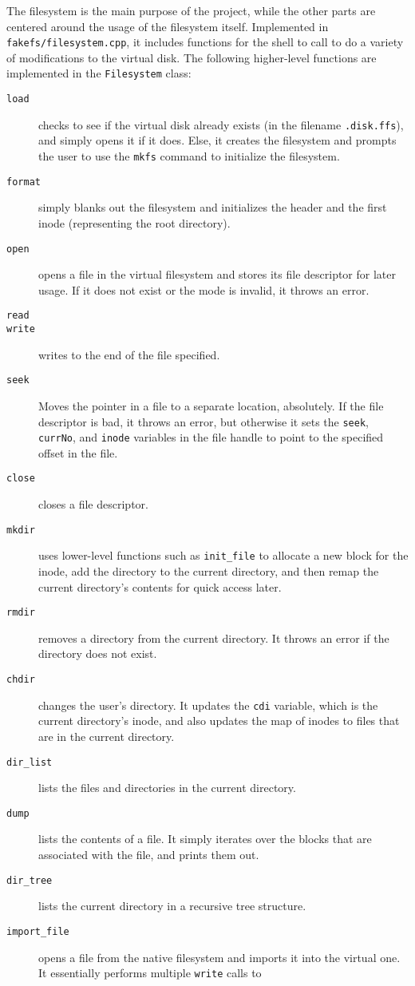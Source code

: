 \documentclass[twoside]{article}
\begin{document}
\begin{multicols}{2}
The filesystem is the main purpose of the project, while the other parts are
centered around the usage of the filesystem itself. Implemented in
\texttt{fakefs/filesystem.cpp}, it includes functions for the shell to call to
do a variety of modifications to the virtual disk. The following higher-level
functions are implemented in the \texttt{Filesystem} class:

\begin{description}
  \item[\texttt{load}] checks to see if the virtual disk already exists (in the
    filename \texttt{.disk.ffs}), and simply opens it if it does. Else, it
    creates the filesystem and prompts the user to use the \texttt{mkfs} command
    to initialize the filesystem.
  \item[\texttt{format}] simply blanks out the filesystem and initializes the
    header and the first inode (representing the root directory).
  \item[\texttt{open}] opens a file in the virtual filesystem and stores its
    file descriptor for later usage. If it does not exist or the mode is
    invalid, it throws an error.
  \item[\texttt{read}] 
  \item[\texttt{write}] writes to the end of the file specified.
  \item[\texttt{seek}] Moves the pointer in a file to a separate location,
    absolutely. If the file descriptor is bad, it throws an error, but otherwise
    it sets the \texttt{seek}, \texttt{currNo}, and \texttt{inode} variables in
    the file handle to point to the specified offset in the file.
  \item[\texttt{close}] closes a file descriptor.
  \item[\texttt{mkdir}] uses lower-level functions such as \texttt{init\_file}
    to allocate a new block for the inode, add the directory to the current
    directory, and then remap the current directory's contents for quick access
    later.
  \item[\texttt{rmdir}] removes a directory from the current directory. It
    throws an error if the directory does not exist.
  \item[\texttt{chdir}] changes the user's directory. It updates the
    \texttt{cdi} variable, which is the current directory's inode, and also
    updates the map of inodes to files that are in the current directory.
  \item[\texttt{dir\_list}] lists the files and directories in the current
    directory.
  \item[\texttt{dump}] lists the contents of a file. It simply iterates over the
    blocks that are associated with the file, and prints them out.
  \item[\texttt{dir\_tree}] lists the current directory in a recursive tree
    structure.
  \item[\texttt{import\_file}] opens a file from the native filesystem and
    imports it into the virtual one. It essentially performs multiple
    \texttt{write} calls to 
\end{description}


\end{multicols}
\end{document}
